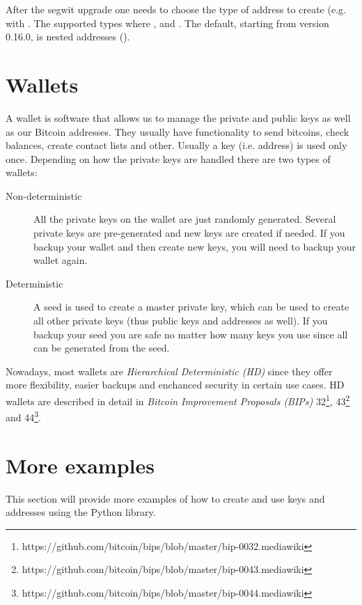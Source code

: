 \begin{note}
After the segwit upgrade one needs to choose the type of address to create (e.g. with . The supported types where ,  and . The default, starting from version 0.16.0, is nested addresses ().
\end{note}


\section{Wallets}

A wallet is software that allows us to manage the private and public keys as well as our Bitcoin addresses. They usually have functionality to send bitcoins, check balances, create contact lists and other. Usually a key (i.e. address) is used only once. Depending on how the private keys are handled there are two types of wallets:

\begin{description}
\item[Non-deterministic] All the private keys on the wallet are just randomly generated. Several private keys are pre-generated and new keys are created if needed. If you backup your wallet and then create new keys, you will need to backup your wallet again.
\item[Deterministic] A seed is used to create a master private key, which can be used to create all other private keys (thus public keys and addresses as well). If you backup your seed you are safe no matter how many keys you use since all can be generated from the seed.
\end{description}

Nowadays, most wallets are \emph{Hierarchical Deterministic (HD)} since they offer more flexibility, easier backups and enchanced security in certain use cases. HD wallets are described in detail in \emph{Bitcoin Improvement Proposals (BIPs)} 32\footnote{https://github.com/bitcoin/bips/blob/master/bip-0032.mediawiki}, 43\footnote{https://github.com/bitcoin/bips/blob/master/bip-0043.mediawiki} and 44\footnote{https://github.com/bitcoin/bips/blob/master/bip-0044.mediawiki}. 


\section{More examples}
This section will provide more examples of how to create and use keys and addresses using the  Python library.

